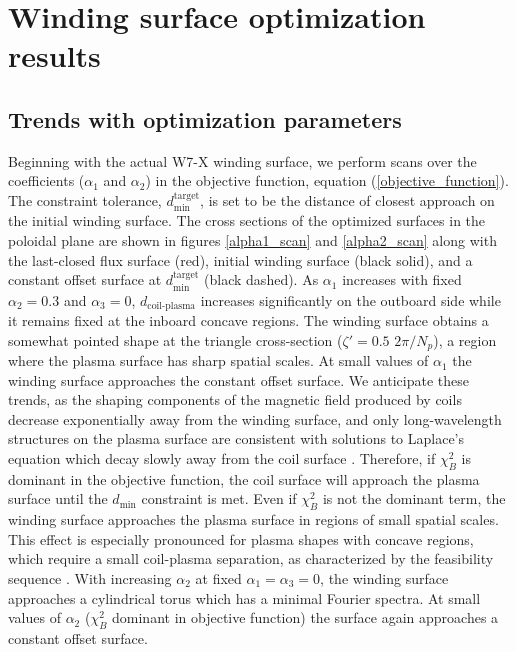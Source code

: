 \documentclass[aps,unsortedaddress]{revtex4-1}
\begin{document}
\section{Winding surface optimization results}
\label{sect_results}

\subsection{Trends with optimization parameters}
\FloatBarrier

Beginning with the actual W7-X winding surface, we perform scans over the coefficients ($\alpha_1$ and $\alpha_2$) in the objective function, equation (\ref{objective_function}). The constraint tolerance, $d_{\text{min}}^{\text{target}}$, is set to be the distance of closest approach on the initial winding surface. The cross sections of the optimized surfaces in the poloidal plane are shown in figures \ref{alpha1_scan} and \ref{alpha2_scan} along with the last-closed flux surface (red), initial winding surface (black solid), and a constant offset surface at $d_{\text{min}}^{\text{target}}$ (black dashed). As $\alpha_1$ increases with fixed $\alpha_2 = 0.3$ and $\alpha_3 = 0$, $d_{\text{coil-plasma}}$ increases significantly on the outboard side while it remains fixed at the inboard concave regions. The winding surface obtains a somewhat pointed shape at the triangle cross-section ($\zeta' = 0.5$ $2\pi/N_p$), a region where the plasma surface has sharp spatial scales. At small values of $\alpha_1$ the winding surface approaches the constant offset surface. We anticipate these trends, as the shaping components of the magnetic field produced by coils decrease exponentially away from the winding surface, and only long-wavelength structures on the plasma surface are consistent with solutions to Laplace's equation which decay slowly away from the coil surface \cite{Boozer2000}. Therefore, if $\chi^2_B$ is dominant in the objective function, the coil surface will approach the plasma surface until the $d_{\text{min}}$ constraint is met. Even if $\chi^2_B$ is not the dominant term, the winding surface approaches the plasma surface in regions of small spatial scales. This effect is especially pronounced for plasma shapes with concave regions, which require a small coil-plasma separation, as characterized by the feasibility sequence \cite{Landreman2016}. With increasing $\alpha_2$ at fixed $\alpha_1 = \alpha_3 = 0$, the winding surface approaches a cylindrical torus which has a minimal Fourier spectra. At small values of $\alpha_2$ ($\chi^2_B$ dominant in objective function) the surface again approaches a constant offset surface. 
\end{document}

